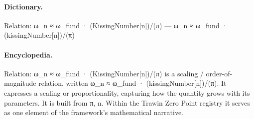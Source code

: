 \paragraph{Dictionary.}
Relation: ω\_n ≈ ω\_fund · (KissingNumber[n])/(π) — ω\_n ≈ ω\_fund · (kissingNumber[n])/(π)

\paragraph{Encyclopedia.}
Relation: ω\_n ≈ ω\_fund · (KissingNumber[n])/(π) is a scaling / order-of-magnitude relation, written ω\_n ≈ ω\_fund · (kissingNumber[n])/(π). It expresses a scaling or proportionality, capturing how the quantity grows with its parameters. It is built from π, n. Within the Trawin Zero Point registry it serves as one element of the framework's mathematical narrative.

